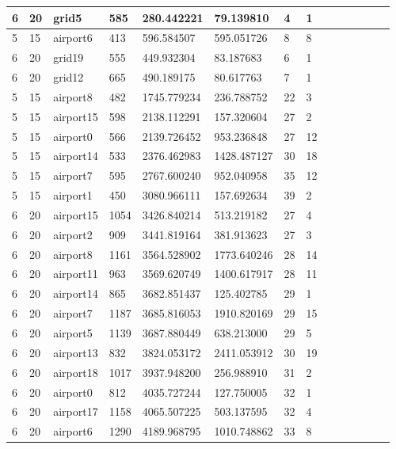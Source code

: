 \documentclass[../thesis.tex]{subfiles}
\begin{document}
\begin{table}[!ht]
\begin{tabularx}{\textwidth}{|X|X|X|X|X|X|X|X|X|X|X|X|X|X|}
        6 & 20 & grid5 & 585 & 280.442221 & 79.139810 & 4 & 1 \\ \hline
        5 & 15 & airport6 & 413 & 596.584507 & 595.051726 & 8 & 8 \\ \hline
        6 & 20 & grid19 & 555 & 449.932304 & 83.187683 & 6 & 1 \\ \hline
        6 & 20 & grid12 & 665 & 490.189175 & 80.617763 & 7 & 1 \\ \hline
        5 & 15 & airport8 & 482 & 1745.779234 & 236.788752 & 22 & 3 \\ \hline
        5 & 15 & airport15 & 598 & 2138.112291 & 157.320604 & 27 & 2 \\ \hline
        5 & 15 & airport0 & 566 & 2139.726452 & 953.236848 & 27 & 12 \\ \hline
        5 & 15 & airport14 & 533 & 2376.462983 & 1428.487127 & 30 & 18 \\ \hline
        5 & 15 & airport7 & 595 & 2767.600240 & 952.040958 & 35 & 12 \\ \hline
        5 & 15 & airport1 & 450 & 3080.966111 & 157.692634 & 39 & 2 \\ \hline
        6 & 20 & airport15 & 1054 & 3426.840214 & 513.219182 & 27 & 4 \\ \hline
        6 & 20 & airport2 & 909 & 3441.819164 & 381.913623 & 27 & 3 \\ \hline
        6 & 20 & airport8 & 1161 & 3564.528902 & 1773.640246 & 28 & 14 \\ \hline
        6 & 20 & airport11 & 963 & 3569.620749 & 1400.617917 & 28 & 11 \\ \hline
        6 & 20 & airport14 & 865 & 3682.851437 & 125.402785 & 29 & 1 \\ \hline
        6 & 20 & airport7 & 1187 & 3685.816053 & 1910.820169 & 29 & 15 \\ \hline
        6 & 20 & airport5 & 1139 & 3687.880449 & 638.213000 & 29 & 5 \\ \hline
        6 & 20 & airport13 & 832 & 3824.053172 & 2411.053912 & 30 & 19 \\ \hline
        6 & 20 & airport18 & 1017 & 3937.948200 & 256.988910 & 31 & 2 \\ \hline
        6 & 20 & airport0 & 812 & 4035.727244 & 127.750005 & 32 & 1 \\ \hline
        6 & 20 & airport17 & 1158 & 4065.507225 & 503.137595 & 32 & 4 \\ \hline
        6 & 20 & airport6 & 1290 & 4189.968795 & 1010.748862 & 33 & 8 \\ \hline

\end{tabularx}
\end{table}
\end{document}
